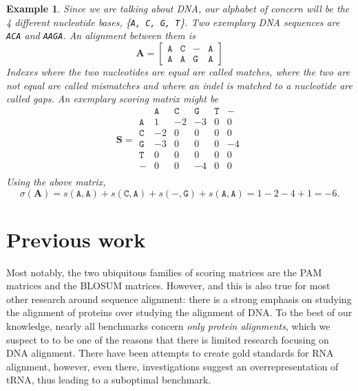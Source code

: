 \documentclass{article}
\newtheorem{example}{Example}
\begin{document}
\begin{example}
    Since we are talking about DNA, our alphabet of concern will be the 4 different nucleotide bases, \{\texttt{A, C, G, T}\}. Two exemplary DNA sequences
    are \texttt{ACA} and \texttt{AAGA}. An alignment between them is
    \begin{equation*}
        \mathbf A = \begin{bmatrix}
            \mathtt{A} & \mathtt{C} & \mathtt{-} & \mathtt{A} \\
            \mathtt{A} & \mathtt{A} & \mathtt{G} & \mathtt{A}
        \end{bmatrix}
    \end{equation*}
    Indexes where the two nucleotides are equal are called \emph{matches}, where the two
    are not equal are called \emph{mismatches} and where an indel is matched to a nucleotide
    are called \emph{gaps}.
    An exemplary scoring matrix might be
    \begin{equation*}
        \mathbf S = \begin{matrix}
                       & \mathtt{A} & \mathtt{C} & \mathtt{G} & \mathtt{T} & \mathtt{-} \\
            \mathtt{A} & 1          & -2         & -3         & 0          & 0          \\
            \mathtt{C} & -2         & 0          & 0          & 0          & 0          \\
            \mathtt{G} & -3         & 0          & 0          & 0          & -4         \\
            \mathtt{T} & 0          & 0          & 0          & 0          & 0          \\
            \mathtt{-} & 0          & 0          & -4         & 0          & 0          \\
        \end{matrix}
    \end{equation*}
    Using the above matrix, \begin{equation*}
        \sigma(\mathbf A) = s(\mathtt A, \mathtt A) + s(\mathtt C, \mathtt A) + s(\mathtt{-}, \mathtt{G}) + s(\mathtt{A}, \mathtt{A}) = 1 - 2 -4 + 1 = -6.
    \end{equation*}
\end{example}
\section{Previous work}

Most notably, the two ubiquitous families of scoring matrices are the PAM matrices
and the BLOSUM matrices. However, and this is also true for most other research around
sequence alignment: there is a strong emphasis on studying the alignment of proteins over
studying the alignment of DNA. To the best of our knowledge, nearly all benchmarks concern \emph{only protein alignments},
which we suspect to to be one of the reasons that there is limited research focusing on DNA alignment. There have been attempts to create gold standards for RNA alignment,
however, even there, investigations suggest an overrepresentation of tRNA, thus leading
to a suboptimal benchmark.
\end{document}
